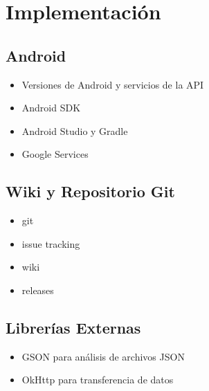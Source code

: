 \chapter{Implementación}
\label{estrategia}

\section{Android}
\begin{itemize}
	\item Versiones de Android y servicios de la API
	\item Android SDK
	\item Android Studio y Gradle
	\item Google Services
\end{itemize}	

\section{Wiki y Repositorio Git}
\begin{itemize}
	\item git
	\item issue tracking 
	\item wiki
	\item releases
\end{itemize}	

\section{Librerías Externas}
\begin{itemize}
	\item GSON para análisis de archivos JSON
	\item OkHttp para transferencia de datos
\end{itemize}	


